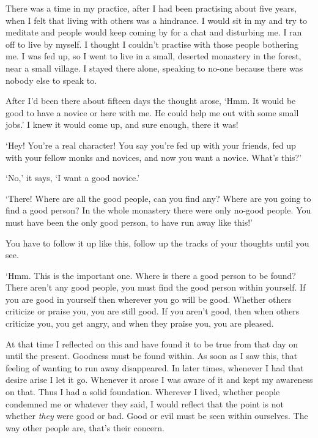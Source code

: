There was a time in my practice, after I had been practising about five years, when I felt that living with others was a hindrance. I would sit in my  and try to meditate and people would keep coming by for a chat and disturbing me. I ran off to live by myself. I thought I couldn't practise with those people bothering me. I was fed up, so I went to live in a small, deserted monastery in the forest, near a small village. I stayed there alone, speaking to no-one because there was nobody else to speak to. 

After I'd been there about fifteen days the thought arose, `Hmm. It would be good to have a novice or \textit{} here with me. He could help me out with some small jobs.' I knew it would come up, and sure enough, there it was! 

`Hey! You're a real character! You say you're fed up with your friends, fed up with your fellow monks and novices, and now you want a novice. What's this?' 

`No,' it says, `I want a good novice.' 

`There! Where are all the good people, can you find any? Where are you going to find a good person? In the whole monastery there were only no-good people. You must have been the only good person, to have run away like this!' 

You have to follow it up like this, follow up the tracks of your thoughts until you see.

`Hmm. This is the important one. Where is there a good person to be found? There aren't any good people, you must find the good person within yourself. If you are good in yourself then wherever you go will be good. Whether others criticize or praise you, you are still good. If you aren't good, then when others criticize you, you get angry, and when they praise you, you are pleased. 

At that time I reflected on this and have found it to be true from that day on until the present. Goodness must be found within. As soon as I saw this, that feeling of wanting to run away disappeared. In later times, whenever I had that desire arise I let it go. Whenever it arose I was aware of it and kept my awareness on that. Thus I had a solid foundation. Wherever I lived, whether people condemned me or whatever they said, I would reflect that the point is not whether \textit{they} were good or bad. Good or evil must be seen within ourselves. The way other people are, that's their concern. 

